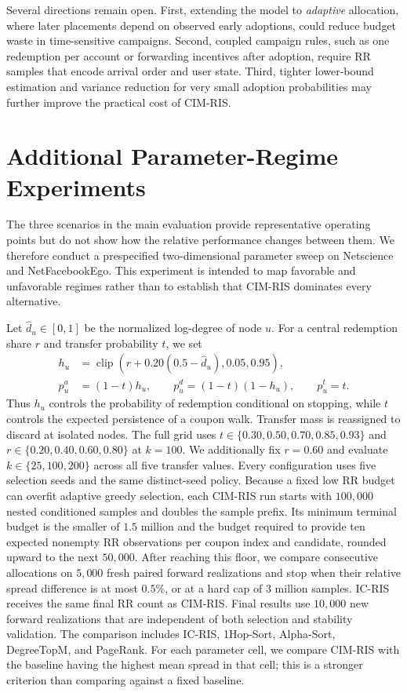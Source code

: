 \documentclass[sigconf,balance=false]{acmart}
\newcommand{\CIMRIS}{\textsc{CIM-RIS}}
\begin{document}
Several directions remain open.
First, extending the model to \emph{adaptive} allocation, where later
placements depend on observed early adoptions, could
reduce budget waste in time-sensitive campaigns.
Second, coupled campaign rules, such as one redemption per account or
forwarding incentives after adoption, require RR samples that encode
arrival order and user state.
Third, tighter lower-bound estimation and variance reduction for very
small adoption probabilities may further improve the practical cost of
\CIMRIS{}.

\appendix
\section{Additional Parameter-Regime Experiments}
\label{app:parameter-sweep}

The three scenarios in the main evaluation provide representative operating
points but do not show how the relative performance changes between them.
We therefore conduct a prespecified two-dimensional parameter sweep on
Netscience and NetFacebookEgo. This experiment is intended to map favorable
and unfavorable regimes rather than to establish that \CIMRIS{} dominates
every alternative.

Let $\hat d_u\in[0,1]$ be the normalized log-degree of node $u$. For a
central redemption share $r$ and transfer probability $t$, we set
\[
\begin{aligned}
  h_u &=
    \operatorname{clip}\!\left(r+0.20(0.5-\hat d_u),0.05,0.95\right),\\
  p_u^a&=(1-t)h_u,\qquad
  p_u^d=(1-t)(1-h_u),\qquad
  p_u^t=t.
\end{aligned}
\]
Thus $h_u$ controls the probability of redemption conditional on stopping,
while $t$ controls the expected persistence of a coupon walk. Transfer mass
is reassigned to discard at isolated nodes. The full grid uses
$t\in\{0.30,0.50,0.70,0.85,0.93\}$ and
$r\in\{0.20,0.40,0.60,0.80\}$ at $k=100$. We additionally fix $r=0.60$ and
evaluate $k\in\{25,100,200\}$ across all five transfer values. Every
configuration uses five selection seeds and the same distinct-seed policy.
Because a fixed low RR budget can overfit adaptive greedy selection, each
\CIMRIS{} run starts with $100{,}000$ nested conditioned samples and doubles
the sample prefix. Its minimum terminal budget is the smaller of $1.5$
million and the budget required to provide ten expected nonempty RR
observations per coupon index and candidate, rounded upward to the next
$50{,}000$. After reaching this floor, we compare consecutive allocations on
$5{,}000$ fresh paired forward realizations and stop when their relative
spread difference is at most $0.5\%$, or at a hard cap of $3$ million
samples. IC-RIS receives the same final RR count as \CIMRIS{}. Final results
use $10{,}000$ new forward realizations that are independent of both selection
and stability validation. The comparison includes IC-RIS, 1Hop-Sort,
Alpha-Sort, DegreeTopM, and PageRank. For each parameter cell, we compare
\CIMRIS{} with the baseline having the highest mean spread in that cell; this
is a stronger criterion than comparing against a fixed baseline.
\end{document}
